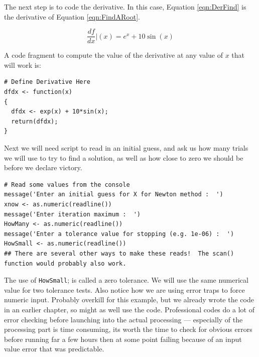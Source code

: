 
The next step is to code the derivative.   In this case, Equation \ref{eqn:DerFind} is the derivative of Equation \ref{eqn:FindARoot}.

\begin{equation}
\frac{df}{dx}\vert{(x)} = e^x + 10 \sin(x)
\label{eqn:DerFind}
\end{equation}

A code fragment to compute the value of the derivative at any value of $x$ that will work is:

\begin{lstlisting}[caption=R code fragment for the derivative calculation, label=lst:NewtonsDerivative]
# Define Derivative Here
dfdx <- function(x)
{
  dfdx <- exp(x) + 10*sin(x); 
  return(dfdx);
}
\end{lstlisting}

Next we will need script to read in an initial guess, and ask us how many trials we will use to try to find a solution, as well as how close to zero we should be before we declare victory.   
\newpage

\begin{lstlisting}[caption=R code fragment for reading input data from the programmer, label=lst:InputNewtonData]
# Read some values from the console
message('Enter an initial guess for X for Newton method :  ')
xnow <- as.numeric(readline())
message('Enter iteration maximum :  ')
HowMany <- as.numeric(readline())
message('Enter a tolerance value for stopping (e.g. 1e-06) :  ')
HowSmall <- as.numeric(readline())
## There are several other ways to make these reads!  The scan() function would probably also work.
\end{lstlisting}



The use of \texttt{HowSmall}; is called a zero tolerance.   We will use the same numerical value for two tolerance tests.   Also notice how we are using error traps to force numeric input.   Probably overkill for this example, but we already wrote the code in an earlier chapter, so might as well use the code.  Professional codes do a lot of error checking before launching into the actual processing --- especially of the processing part is time consuming, its worth the time to check for obvious errors before running far a few hours then at some point failing because of an input value error that was predictable.

